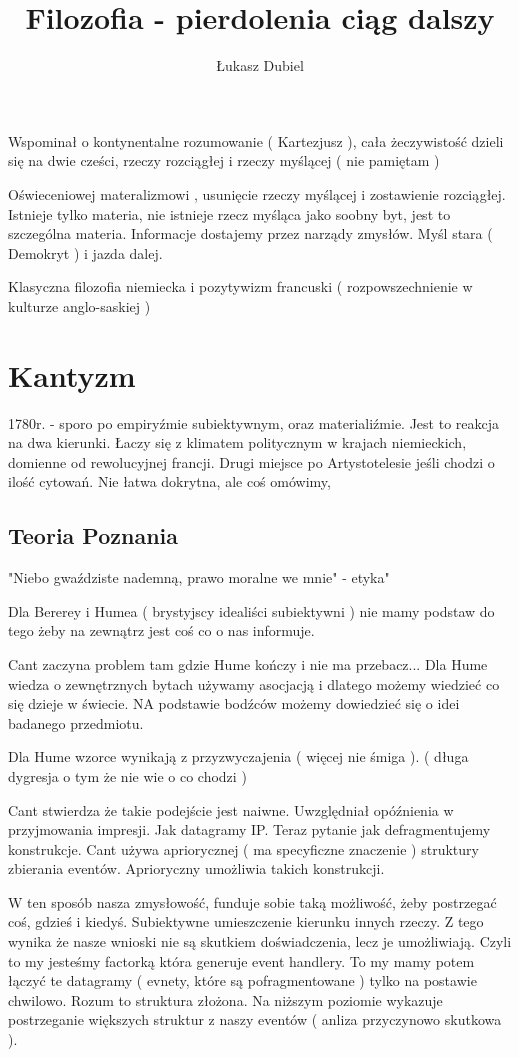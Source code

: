 \documentclass[11pt]{article}
\author{Łukasz Dubiel}
\title{Filozofia - pierdolenia ciąg dalszy}
\begin{document}
\maketitle

Wspominał o kontynentalne rozumowanie ( Kartezjusz ), cała żeczywistość dzieli się na dwie cześci, rzeczy rozciągłej i rzeczy myślącej ( nie pamiętam )

Oświeceniowej materalizmowi , usunięcie rzeczy myślącej i zostawienie rozciągłej. Istnieje tylko materia, nie istnieje rzecz myśląca jako soobny byt, jest to szczególna materia. Informacje dostajemy przez narządy zmysłów. 
Myśl stara ( Demokryt ) i jazda dalej.

Klasyczna filozofia niemiecka i pozytywizm francuski  ( rozpowszechnienie w kulturze anglo-saskiej )

\section{Kantyzm}
1780r. - sporo po empiryźmie subiektywnym, oraz materialiźmie. Jest to reakcja na dwa kierunki. Łaczy się z klimatem politycznym w krajach niemieckich, domienne od rewolucyjnej francji. Drugi miejsce po Artystotelesie jeśli chodzi o ilość cytowań. Nie łatwa dokrytna, ale coś omówimy,

\subsection{Teoria Poznania}
"Niebo gwaździste nademną, prawo moralne we mnie" - etyka"

Dla Bererey i Humea ( brystyjscy idealiści subiektywni ) nie mamy podstaw do tego żeby na zewnątrz jest coś co o nas informuje. 

Cant zaczyna problem tam gdzie Hume kończy i nie ma przebacz... Dla Hume wiedza o zewnętrznych bytach używamy asocjacją i dlatego możemy wiedzieć co się dzieje w świecie. NA podstawie bodźców możemy dowiedzieć się o idei badanego przedmiotu.

Dla Hume wzorce wynikają z przyzwyczajenia ( więcej nie śmiga ). ( długa dygresja o tym że nie wie o co chodzi )

Cant stwierdza że takie podejście jest naiwne. Uwzględniał opóźnienia w przyjmowania impresji. Jak datagramy IP. Teraz pytanie jak defragmentujemy konstrukcje. Cant używa apriorycznej ( ma specyficzne znaczenie ) struktury zbierania eventów. Aprioryczny umożliwia takich konstrukcji. 

W ten sposób nasza zmysłowość, funduje sobie taką możliwość, żeby postrzegać coś, gdzieś i kiedyś. Subiektywne umieszczenie kierunku innych rzeczy.
Z tego wynika że nasze wnioski nie są skutkiem doświadczenia, lecz je umożliwiają. Czyli to my jesteśmy factorką która generuje event handlery. To my mamy potem łączyć te datagramy ( evnety, które są pofragmentowane ) tylko na postawie chwilowo.
Rozum to struktura złożona. Na niższym poziomie wykazuje postrzeganie większych struktur z naszy eventów ( anliza przyczynowo skutkowa ). 
\end{document}
